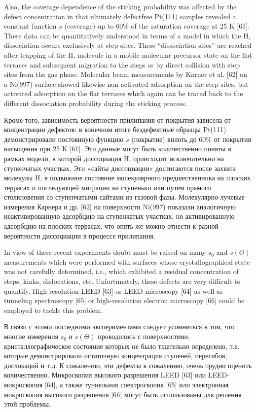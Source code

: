 \documentclass[11pt]{article}
\begin{document}
Also, the coverage dependence of the sticking probability was affected
by the defect concentration in that ultimately defectfree Pt(111)
samples revealed a constant function \(s\) (coverage) up to 60\% of the
saturation coverage at 25 K {[}61{]}. These data can be quantitatively
understood in terms of a model in which the H, dissociation occurs
exclusively at step sites. These ``dissociation sites'' are reached
after trapping of the H, molecule in a mobile molecular precursor state
on the flat terraces and subsequent migration to the steps or by direct
collision with step sites from the gas phase. Molecular beam
measurements by Karner et al. {[}62{]} on a Ni(997) surface showed
likewise non-activated adsorption on the step sites, but activated
adsorption on the flat terraces which again can be traced back to the
different dissociation probability during the sticking process.

Кроме того, зависимость вероятности прилипания от покрытия зависела от
концентрации дефектов: в конечном итоге бездефектные образцы Pt(111)
демонстрировали постоянную функцию \(s\) (покрытие) вплоть до 60\% от
покрытия насыщения при 25 K {[}61{]}. Эти данные могут быть
количественно поняты в рамках модели, в которой диссоциация H,
происходит исключительно на ступенчатых участках. Эти «сайты
диссоциации» достигаются после захвата молекулы H, в подвижное состояние
молекулярного предшественника на плоских террасах и последующей миграции
на ступеньки или путем прямого столкновения со ступенчатыми сайтами из
газовой фазы. Молекулярно-лучевые измерения Карнера и др. {[}62{]} на
поверхности Ni(997) показали аналогичную неактивированную адсорбцию на
ступенчатых участках, но активированную адсорбцию на плоских террасах,
что опять же можно отнести к разной вероятности диссоциации в процессе
прилипания.

In view of these recent experiments doubt must be raised on many \(s_0\)
and \(s(\Theta)\) measurements which were performed with surfaces whose
crystallographical state was not carefully determined, i.e., which
exhibited a residual concentration of steps, kinks, dislocations, etc.
Unfortunately, these defects are very difficult to quantify.
High-resolution LEED {[}63{]} or LEED microscopy {[}64{]} as well as
tunneling spectroscopy {[}65{]} or high-resolution electron microscopy
{[}66{]} could be employed to tackle this problem.

В связи с этими последними экспериментами следует усомниться в том, что
многие измерения \(s_0\) и \(s(\Theta)\) проводились с поверхностями,
кристаллографическое состояние которых не было тщательно определено,
т.е. которые демонстрировали остаточную концентрация ступеней,
перегибов, дислокаций и т.д. К сожалению, эти дефекты к сожалению, очень
трудно оценить количественно. Микроскопия высокого разрешения LEED
{[}63{]} или LEED-микроскопия {[}64{]}, а также туннельная спектроскопия
{[}65{]} или электронная микроскопия высокого разрешения {[}66{]} могут
быть использованы для решения этой проблемы.
\end{document}
